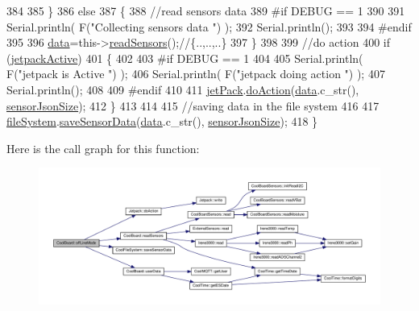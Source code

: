 \begin{DoxyCode}
384                 
385     \}   
386     \textcolor{keywordflow}{else}
387     \{
388         \textcolor{comment}{//read sensors data}
389 \textcolor{preprocessor}{    #if DEBUG == 1}
390 
391         Serial.println( F(\textcolor{stringliteral}{"Collecting sensors data "}) );
392         Serial.println();
393 
394 \textcolor{preprocessor}{    #endif}
395 
396         \hyperlink{classCoolBoard_a427fb753dd8575bdf821c70a5c63d695}{data}=this->\hyperlink{classCoolBoard_ad03abdce2e65f520bbf2cff0f2d083cf}{readSensors}();\textcolor{comment}{//\{..,..,..\}}
397     \}
398 
399     \textcolor{comment}{//do action}
400     \textcolor{keywordflow}{if} (\hyperlink{classCoolBoard_a9be03a913d26e558328935ca3b59a75e}{jetpackActive})
401     \{
402 
403 \textcolor{preprocessor}{    #if DEBUG == 1}
404 
405         Serial.println( F(\textcolor{stringliteral}{"jetpack is Active "}) );
406         Serial.println( F(\textcolor{stringliteral}{"jetpack doing action "}) );
407         Serial.println();
408     
409 \textcolor{preprocessor}{    #endif}
410 
411         \hyperlink{classCoolBoard_a30b1357881b01ccbec676856a91e48e9}{jetPack}.\hyperlink{classJetpack_a86d2e83436ef4b85f4c3a6e85ac785b0}{doAction}(\hyperlink{classCoolBoard_a427fb753dd8575bdf821c70a5c63d695}{data}.c\_str(), \hyperlink{classCoolBoard_a58e4b6072e3ac8b141ec0befb479208e}{sensorJsonSize});
412     \}
413     
414     
415     \textcolor{comment}{//saving data in the file system}
416     
417     \hyperlink{classCoolBoard_a42c2586fbb13ff7f06538e9284e8538d}{fileSystem}.\hyperlink{classCoolFileSystem_a4c560c2ddd40b74b7758e6ceb2c58957}{saveSensorData}(\hyperlink{classCoolBoard_a427fb753dd8575bdf821c70a5c63d695}{data}.c\_str(), 
      \hyperlink{classCoolBoard_a58e4b6072e3ac8b141ec0befb479208e}{sensorJsonSize});
418 \}
\end{DoxyCode}
Here is the call graph for this function\+:
\nopagebreak
\begin{figure}[H]
\begin{center}
\leavevmode
\includegraphics[width=350pt]{classCoolBoard_ae6b5e1274d760462290192acea4adca8_cgraph}
\end{center}
\end{figure}
\mbox{\label{classCoolBoard_aa0bbc4bc605e35618d18e68795c61363}} 
